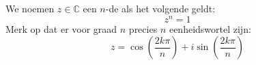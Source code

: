 \documentclass[main.tex]{subfiles}
\begin{document}
\begin{de}
  We noemen $z\in \mathbb{C}$ een $n$-de  als het volgende geldt:
  \[ z^{n} = 1 \]
  Merk op dat er voor graad $n$ precies $n$ eenheidswortel zijn:
  \[ z = \cos\left(\frac{2k\pi}{n}\right) + i \sin \left( \frac{2k\pi}{n} \right) \]
\end{de}
\end{document}
